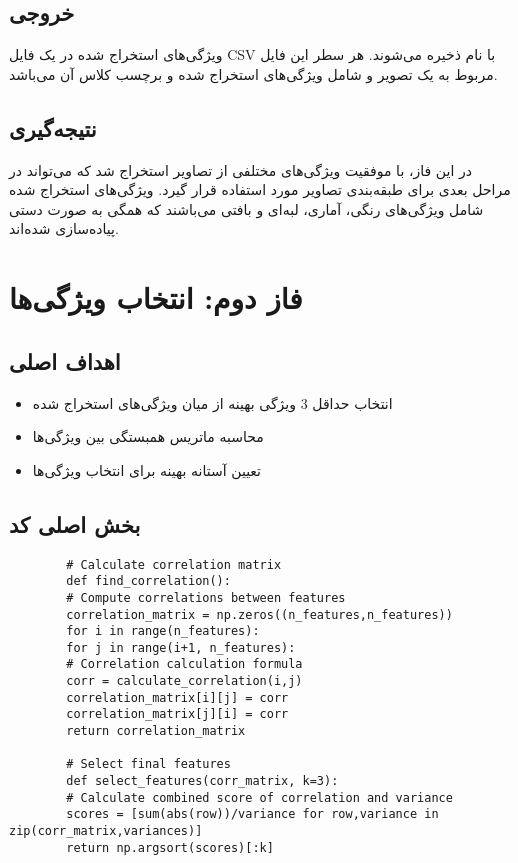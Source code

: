 \documentclass[a4paper,12pt]{article}
\let\nobreaksection\section
\renewcommand{\section}{\nobreaksection}  %
\begin{document}
	\subsection{خروجی}
	ویژگی‌های استخراج شده در یک فایل CSV با نام  ذخیره می‌شوند. هر سطر این فایل مربوط به یک تصویر و شامل ویژگی‌های استخراج شده و برچسب کلاس آن می‌باشد.
	
	\subsection{نتیجه‌گیری}
	در این فاز، با موفقیت ویژگی‌های مختلفی از تصاویر استخراج شد که می‌تواند در مراحل بعدی برای طبقه‌بندی تصاویر مورد استفاده قرار گیرد. ویژگی‌های استخراج شده شامل ویژگی‌های رنگی، آماری، لبه‌ای و بافتی می‌باشند که همگی به صورت دستی پیاده‌سازی شده‌اند.
	
	\section{فاز دوم: انتخاب ویژگی‌ها}
	
	\subsection{اهداف اصلی}
	\begin{itemize}
		\item انتخاب حداقل 3 ویژگی بهینه از میان ویژگی‌های استخراج شده
		\item محاسبه ماتریس همبستگی بین ویژگی‌ها
		\item تعیین آستانه بهینه برای انتخاب ویژگی‌ها
	\end{itemize}
	
	\subsection{بخش اصلی کد}
\begin{latin}
	\begin{verbatim}
		# Calculate correlation matrix
		def find_correlation():
		# Compute correlations between features
		correlation_matrix = np.zeros((n_features,n_features))
		for i in range(n_features):
		for j in range(i+1, n_features):
		# Correlation calculation formula
		corr = calculate_correlation(i,j)
		correlation_matrix[i][j] = corr
		correlation_matrix[j][i] = corr
		return correlation_matrix
		
		# Select final features
		def select_features(corr_matrix, k=3):
		# Calculate combined score of correlation and variance
		scores = [sum(abs(row))/variance for row,variance in zip(corr_matrix,variances)]
		return np.argsort(scores)[:k]
	\end{verbatim}
\end{latin}
	
\end{document}
